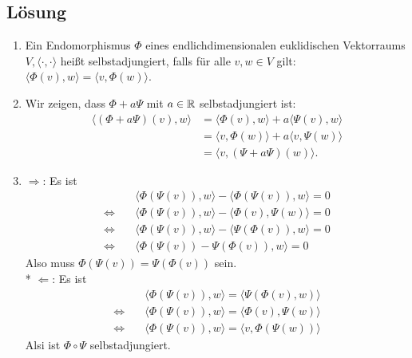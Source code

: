 \subsection{Lösung}
\begin{enumerate}
	\item Ein Endomorphismus \( \Phi \) eines endlichdimensionalen euklidischen Vektorraums \( V, \langle \cdot,\cdot \rangle \) heißt selbstadjungiert, falls für alle \( v,w \in V \) gilt: \( \langle \Phi(v),w \rangle = \langle v,\Phi(w) \rangle \).
	\item Wir zeigen, dass \( \Phi + a\Psi \) mit \( a \in \mathbb{R} \) selbstadjungiert ist:
	\begin{align*}
		\langle (\Phi + a\Psi)(v),w \rangle &= \langle \Phi(v),w \rangle + a\langle \Psi(v),w \rangle \\
		&= \langle v,\Phi(w) \rangle + a\langle v,\Psi(w) \rangle \\
		&= \langle v,(\Psi + a\Psi)(w) \rangle\text{.}
	\end{align*}
	\item \( \Rightarrow \): Es ist
	\begin{align*}
		\quad &\langle \Phi(\Psi(v)),w \rangle - \langle \Phi(\Psi(v)),w \rangle = 0 \\
		\Leftrightarrow \quad &\langle \Phi(\Psi(v)),w \rangle - \langle \Phi(v),\Psi(w) \rangle = 0 \\
		\Leftrightarrow \quad &\langle \Phi(\Psi(v)),w \rangle - \langle \Psi(\Phi(v)),w \rangle = 0 \\
		\Leftrightarrow \quad &\langle \Phi(\Psi(v))-\Psi(\Phi(v)),w \rangle = 0
	\end{align*}
	Also muss \( \Phi(\Psi(v)) =\Psi(\Phi(v)) \) sein.
	\\*
	\( \Leftarrow \): Es ist
	\begin{align*}
		\quad &\langle \Phi(\Psi(v)),w \rangle = \langle \Psi(\Phi(v),w) \rangle \\
		\Leftrightarrow \quad &\langle \Phi(\Psi(v)),w \rangle = \langle \Phi(v),\Psi(w) \rangle \\
		\Leftrightarrow \quad &\langle \Phi(\Psi(v)),w \rangle = \langle v,\Phi(\Psi(w)) \rangle
	\end{align*}
	Alsi ist \( \Phi \circ \Psi \) selbstadjungiert.
\end{enumerate}